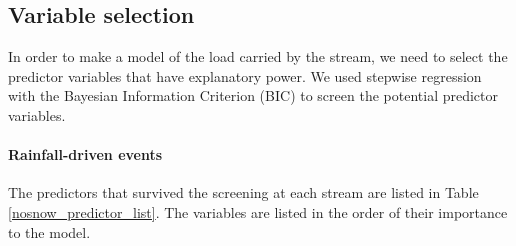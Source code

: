 \documentclass[10pt]{article}
\begin{document}
\subsection{Variable selection}
In order to make a model of the load carried by the stream, we need to select the predictor variables that have explanatory power. We used stepwise regression with the Bayesian Information Criterion (BIC) to screen the potential predictor variables.

\paragraph{Rainfall-driven events} The predictors that survived the screening at each stream are listed in Table \ref{nosnow_predictor_list}. The variables are listed in the order of their importance to the model.\\
\end{document}
